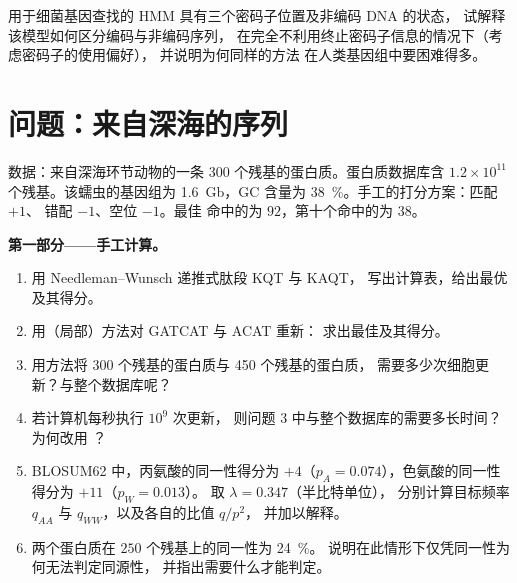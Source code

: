 \begin{exercise}[$\star\star\star$]\label{exo:b3:bioinformatics:12}
用于细菌基因查找的 HMM 具有三个密码子位置及非编码 DNA 的状态，
试解释该模型如何区分编码与非编码序列，
在完全不利用终止密码子信息的情况下（考虑密码子的使用偏好），
并说明为何同样的方法
在人类基因组中要困难得多。
\end{exercise}

\section{问题：来自深海的序列}

\begin{problem}
\label{pb:b3:bioinformatics:1}
数据：来自深海环节动物的一条 \num{300} 个残基的蛋白质。蛋白质数据库含
$1.2\times 10^{11}$ 个残基。该蠕虫的基因组为
\qty{1.6}{Gb}，GC 含量为 \qty{38}{\%}。手工的打分方案：匹配 $+1$、
错配 $-1$、空位 $-1$。最佳  命中的为 $92$，第十个命中的为
$38$。

\medskip
\noindent\textbf{第一部分——手工计算。}
\begin{enumerate}
  \item 用 Needleman--Wunsch 递推式肽段 KQT 与 KAQT，
        写出计算表，给出最优
        及其得分。
  \item 用（局部）方法对 GATCAT 与 ACAT 重新：
        求出最佳及其得分。
  \item 用方法将
        \num{300} 个残基的蛋白质与 \num{450} 个残基的蛋白质，
        需要多少次细胞更新？与整个数据库呢？
  \item 若计算机每秒执行 $10^{9}$ 次更新，
        则问题 3 中与整个数据库的需要多长时间？
        为何改用 ？
  \item BLOSUM62 中，丙氨酸的同一性得分为 $+4$（$p_{A} =
        0.074$），色氨酸的同一性得分为 $+11$（$p_{W} = 0.013$）。
        取 $\lambda = 0.347$（半比特单位），
        分别计算目标频率 $q_{AA}$ 与 $q_{WW}$，以及各自的比值 $q/p^{2}$，
        并加以解释。
  \item 两个蛋白质在 $250$ 个残基上的同一性为 \qty{24}{\%}。
        说明在此情形下仅凭同一性为何无法判定同源性，
        并指出需要什么才能判定。
\end{enumerate}


\end{problem}
